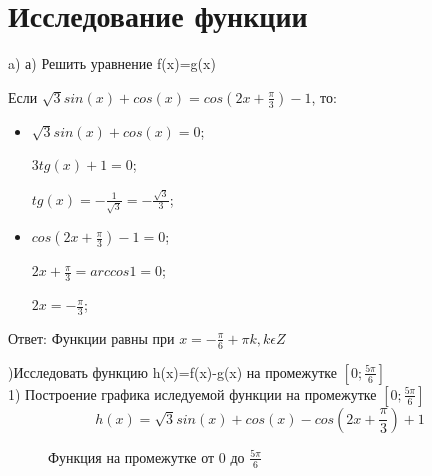 \documentclass[russian,utf8,nocolumnxxxi,nocolumnxxxii]{eskdtext}
\begin{document}
\newpage
\section{Исследование функции}

    \item[a)] а) Решить уравнение f(x)=g(x)
    
   Если $\sqrt{3}sin(x)+cos(x)=cos(2x+\frac{\pi}{3})-1$,
   то:
   \begin{itemize}
   \renewcommand{\labelitemi}{$\bullet$}
       \item $\sqrt{3}sin(x)+cos(x)=0$;
       
       $3tg(x)+1=0$;
       
       $tg(x)=-\frac{1}{\sqrt{3}}=-\frac{\sqrt{3}}{3}$;
       
       \item $cos(2x+\frac{\pi}{3})-1=0$;
       
       $2x+\frac{\pi}{3}=arccos 1=0$;
       
       $2x=-\frac{\pi}{3}$;

   \end{itemize}
   
 Ответ: Функции равны при $x=-\frac{\pi}{6}+\pi k,  k \epsilon Z$
    
{)Исследовать функцию h(x)=f(x)-g(x) на промежутке $[0;\frac{5\pi}{6}]$ }\\
1) Построение графика иследуемой функции на промежутке $[0;\frac{5\pi}{6}]$ \\
     $$h(x) = \sqrt{3}sin(x)+cos(x)-cos(2x+\frac{\pi}{3})+1$$
     
     
     \begin{figure}[h]
      \centering
      \caption{Функция на промежутке от 0 до $\frac{5\pi}{6}$}
    
    
   \end{figure}
    
\end{document}
